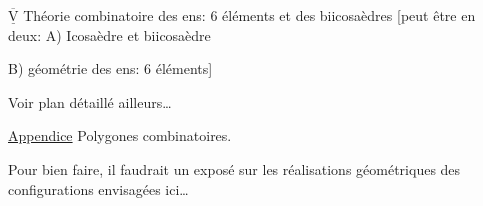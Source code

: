 
$\overline{\underline{\mathrm V}}$ Théorie combinatoire des ens: 6 éléments et des biicosaèdres [peut être  en deux: A) Icosaèdre et biicosaèdre

B) géométrie des ens: 6 éléments]

Voir plan détaillé ailleurs\ldots


\uline{Appendice} Polygones combinatoires.

Pour bien faire, il faudrait un exposé sur les réalisations géométriques des configurations envisagées ici\ldots

